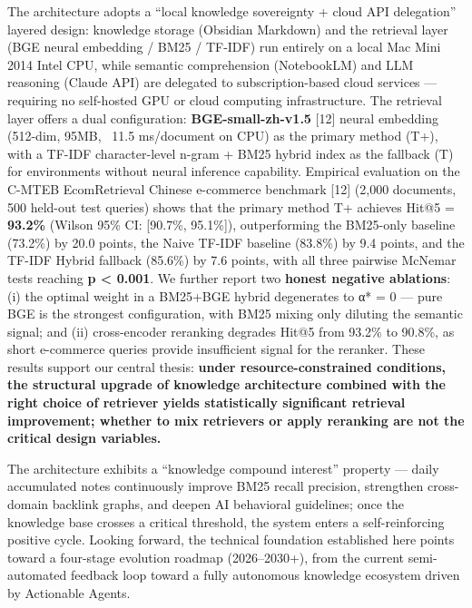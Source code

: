 The architecture adopts a ``local knowledge sovereignty + cloud API
delegation'' layered design: knowledge storage (Obsidian Markdown) and
the retrieval layer (BGE neural embedding / BM25 / TF-IDF) run entirely
on a local Mac Mini 2014 Intel CPU, while semantic comprehension
(NotebookLM) and LLM reasoning (Claude API) are delegated to
subscription-based cloud services --- requiring no self-hosted GPU or
cloud computing infrastructure. The retrieval layer offers a dual
configuration: \textbf{BGE-small-zh-v1.5} {[}12{]} neural embedding
(512-dim, 95MB, ~11.5 ms/document on CPU) as the primary method (T+),
with a TF-IDF character-level n-gram + BM25 hybrid index as the
fallback (T) for environments without neural inference capability.
Empirical evaluation on the C-MTEB EcomRetrieval Chinese e-commerce
benchmark {[}12{]} (2,000 documents, 500 held-out test queries) shows
that the primary method T+ achieves Hit@5 = \textbf{93.2\%} (Wilson
95\% CI: {[}90.7\%, 95.1\%{]}), outperforming the BM25-only baseline
(73.2\%) by 20.0 points, the Naive TF-IDF baseline (83.8\%) by 9.4
points, and the TF-IDF Hybrid fallback (85.6\%) by 7.6 points, with all
three pairwise McNemar tests reaching \textbf{p < 0.001}. We further
report two \textbf{honest negative ablations}: (i) the optimal weight
in a BM25+BGE hybrid degenerates to α* = 0 --- pure BGE is the strongest
configuration, with BM25 mixing only diluting the semantic signal; and
(ii) cross-encoder reranking degrades Hit@5 from 93.2\% to 90.8\%, as
short e-commerce queries provide insufficient signal for the reranker.
These results support our central thesis: \textbf{under
resource-constrained conditions, the structural upgrade of knowledge
architecture combined with the right choice of retriever yields
statistically significant retrieval improvement; whether to mix
retrievers or apply reranking are not the critical design variables.}

The architecture exhibits a ``knowledge compound interest'' property ---
daily accumulated notes continuously improve BM25 recall precision,
strengthen cross-domain backlink graphs, and deepen AI behavioral
guidelines; once the knowledge base crosses a critical threshold, the
system enters a self-reinforcing positive cycle. Looking forward, the
technical foundation established here points toward a four-stage
evolution roadmap (2026--2030+), from the current semi-automated
feedback loop toward a fully autonomous knowledge ecosystem driven by
Actionable Agents.

